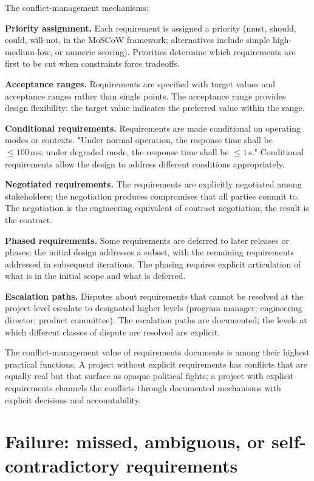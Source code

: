 The conflict-management mechanisms:

\textbf{Priority assignment.} Each requirement is assigned a priority (must, should, could, will-not, in the MoSCoW framework; alternatives include simple high-medium-low, or numeric scoring). Priorities determine which requirements are first to be cut when constraints force tradeoffs.

\textbf{Acceptance ranges.} Requirements are specified with target values and acceptance ranges rather than single points. The acceptance range provides design flexibility; the target value indicates the preferred value within the range.

\textbf{Conditional requirements.} Requirements are made conditional on operating modes or contexts. "Under normal operation, the response time shall be $\leq 100\,\text{ms}$; under degraded mode, the response time shall be $\leq 1\,\text{s}$." Conditional requirements allow the design to address different conditions appropriately.

\textbf{Negotiated requirements.} The requirements are explicitly negotiated among stakeholders; the negotiation produces compromises that all parties commit to. The negotiation is the engineering equivalent of contract negotiation; the result is the contract.

\textbf{Phased requirements.} Some requirements are deferred to later releases or phases; the initial design addresses a subset, with the remaining requirements addressed in subsequent iterations. The phasing requires explicit articulation of what is in the initial scope and what is deferred.

\textbf{Escalation paths.} Disputes about requirements that cannot be resolved at the project level escalate to designated higher levels (program manager; engineering director; product committee). The escalation paths are documented; the levels at which different classes of dispute are resolved are explicit.

The conflict-management value of requirements documents is among their highest practical functions. A project without explicit requirements has conflicts that are equally real but that surface as opaque political fights; a project with explicit requirements channels the conflicts through documented mechanisms with explicit decisions and accountability.

\section{Failure: missed, ambiguous, or self-contradictory requirements}


